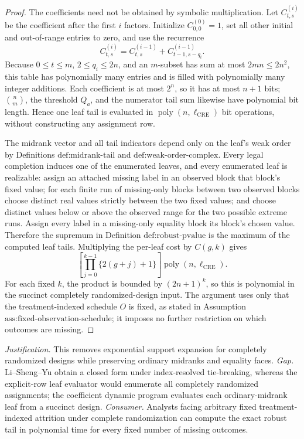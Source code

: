 \documentclass{article}
\begin{document}
\begin{proof}
The coefficients need not be obtained by symbolic multiplication.  Let
\(C^{(i)}_{t,s}\) be the coefficient after the first \(i\) factors.  Initialize
\(C^{(0)}_{0,0}=1\), set all other initial and out-of-range entries to zero,
and use the recurrence
\[
 C^{(i)}_{t,s}
 =C^{(i-1)}_{t,s}+C^{(i-1)}_{t-1,s-q_i}.
\]
Because \(0\le t\le m\), \(2\le q_i\le2n\), and an \(m\)-subset has sum at
most \(2mn\le2n^2\), this table has polynomially many entries and is filled
with polynomially many integer additions.  Each coefficient is at most
\(2^n\), so it has at most \(n+1\) bits; \(\binom{n}{m}\), the threshold
\(Q_a\), and the numerator tail sum likewise have polynomial bit length.
Hence one leaf tail is evaluated in
\(\operatorname{poly}(n,\ell_{\mathrm{CRE}})\) bit operations, without
constructing any assignment row.

The midrank vector and all tail indicators depend only on the leaf's weak
order by Definitions \(\text{def:midrank-tail}\) and
\(\text{def:weak-order-complex}\).  Every legal completion induces one of the
enumerated leaves, and every enumerated leaf is realizable: assign an attached
missing label in an observed block that block's fixed value; for each finite
run of missing-only blocks between two observed blocks choose distinct real
values strictly between the two fixed values; and choose distinct values below
or above the observed range for the two possible extreme runs.  Assign every
label in a missing-only equality block its block's chosen value.  Therefore the
supremum in
Definition \(\text{def:robust-pvalue}\) is the maximum of the computed leaf
tails.  Multiplying the per-leaf cost by \(C(g,k)\) gives
\[
 \left[\prod_{j=0}^{k-1}\{2(g+j)+1\}\right]
 \operatorname{poly}(n,\ell_{\mathrm{CRE}}).
\]
For each fixed \(k\), the product is bounded by \((2n+1)^k\), so this is
polynomial in the succinct completely randomized-design input.  The argument
uses only that the treatment-indexed schedule \(O\) is fixed, as stated in
Assumption \(\text{ass:fixed-observation-schedule}\); it imposes no further
restriction on which outcomes are missing.
\end{proof}
\par\smallskip\noindent \textit{Justification.} This removes exponential support expansion for completely randomized designs while preserving ordinary midranks and equality faces. \textit{Gap.} Li--Sheng--Yu obtain a closed form under index-resolved tie-breaking, whereas the explicit-row leaf evaluator would enumerate all completely randomized assignments; the coefficient dynamic program evaluates each ordinary-midrank leaf from a succinct design. \textit{Consumer.} Analysts facing arbitrary fixed treatment-indexed attrition under complete randomization can compute the exact robust tail in polynomial time for every fixed number of missing outcomes.
\end{document}
